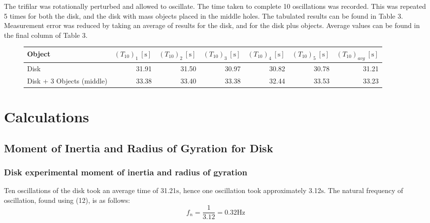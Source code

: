 \documentclass[a4paper]{article}
\begin{document}
The trifilar was rotationally perturbed and allowed to oscillate. The time taken to complete 10 oscillations was recorded. This was repeated 5 times for both the disk, and the disk with mass objects placed in the middle holes. The tabulated results can be found in Table 3. Measurement error was reduced by taking an average of results for the disk, and for the disk plus objects. Average values can be found in the final column of Table 3. 

\vspace{0.5cm}

\begin{figure}[h]
	\centering
	\small
	\begin{tabular}{lrrrrrr}
		\toprule
		Object & $(T_{10})_1 \ [\si{\second}]$ & $(T_{10})_2 \ [\si{\second}]$ & $(T_{10})_3 \ [\si{\second}]$ & $(T_{10})_4 \ [\si{\second}]$ & $(T_{10})_5 \ [\si{\second}]$ & $(T_{10})_{avg} \ [\si{\second}]$ \\
		\midrule
		Disk & 31.91 & 31.50 & 30.97 & 30.82 & 30.78 & 31.21\\
		Disk + 3 Objects (middle) & 33.38 & 33.40 & 33.38 & 32.44 & 33.53 & 33.23 \\
		\bottomrule
	\end{tabular}
\end{figure}


\newpage

\section{Calculations}
\subsection{Moment of Inertia and Radius of Gyration for Disk}
\subsubsection{Disk experimental moment of inertia and radius of gyration}
Ten oscillations of the disk took an average time of 31.21$\si{\second}$, hence one oscillation took approximately 3.12$\si{\second}$. The natural frequency of oscillation, found using (12), is as follows:
\begin{equation}
f_n = \frac{1}{3.12} = 0.32\si{\hertz}
\end{equation}
\end{document}
